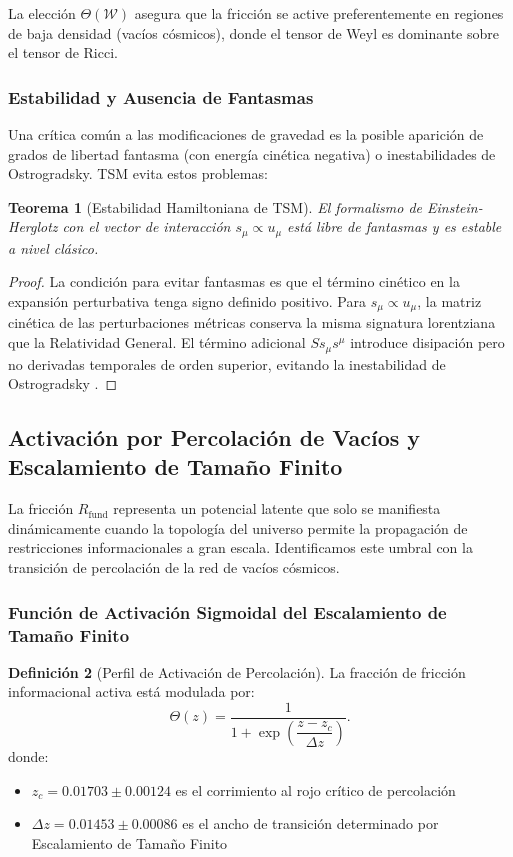 \documentclass[11pt, a4paper]{article}
\theoremstyle{plain}
\newtheorem{teorema}{Teorema}[section]
\theoremstyle{definition}
\newtheorem{definicion}[teorema]{Definición}
\newcommand{\Rfactor}{R_{\text{fund}}}
\begin{document}
La elección $\Theta(\mathcal{W})$ asegura que la fricción se active preferentemente en regiones de baja densidad (vacíos cósmicos), donde el tensor de Weyl es dominante sobre el tensor de Ricci.

\subsubsection{Estabilidad y Ausencia de Fantasmas}

Una crítica común a las modificaciones de gravedad es la posible aparición de grados de libertad fantasma (con energía cinética negativa) o inestabilidades de Ostrogradsky. TSM evita estos problemas:

\begin{teorema}[Estabilidad Hamiltoniana de TSM]
El formalismo de Einstein-Herglotz con el vector de interacción $s_\mu \propto u_\mu$ está libre de fantasmas y es estable a nivel clásico.
\end{teorema}

\begin{proof}
La condición para evitar fantasmas es que el término cinético en la expansión perturbativa tenga signo definido positivo. Para $s_\mu \propto u_\mu$, la matriz cinética de las perturbaciones métricas conserva la misma signatura lorentziana que la Relatividad General. El término adicional $S s_\mu s^\mu$ introduce disipación pero no derivadas temporales de orden superior, evitando la inestabilidad de Ostrogradsky \cite{Lazo2017}.
\end{proof}

\subsection{Activación por Percolación de Vacíos y Escalamiento de Tamaño Finito}

La fricción $\Rfactor$ representa un potencial latente que solo se manifiesta dinámicamente cuando la topología del universo permite la propagación de restricciones informacionales a gran escala. Identificamos este umbral con la transición de percolación de la red de vacíos cósmicos.

\subsubsection{Función de Activación Sigmoidal del Escalamiento de Tamaño Finito}

\begin{definicion}[Perfil de Activación de Percolación]
La fracción de fricción informacional activa está modulada por:
\begin{equation}
\Theta(z) = \frac{1}{1 + \exp\left(\dfrac{z - z_c}{\Delta z}\right)}.
\label{eq:activation_function}
\end{equation}
donde:
\begin{itemize}
    \item $z_c = 0.01703 \pm 0.00124$ es el corrimiento al rojo crítico de percolación
    \item $\Delta z = 0.01453 \pm 0.00086$ es el ancho de transición determinado por Escalamiento de Tamaño Finito
\end{itemize}
\end{definicion}
\end{document}
